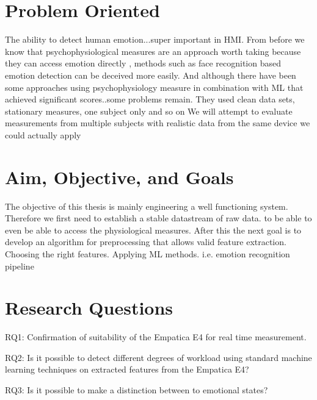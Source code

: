 
\section{Problem Oriented}
The ability to detect human emotion...super important in HMI.
From before we know that psychophysiological measures are an approach worth taking because they can access emotion directly , methods such as face recognition based emotion detection can be deceived more easily.
And although there have been some approaches using psychophysiology measure in combination with ML that achieved significant scores..some problems remain.
They used clean data sets, stationary measures, one subject only and so on
We will attempt to evaluate measurements from multiple subjects with realistic data from the same device we could actually apply
\section{Aim, Objective, and Goals}
The objective of this thesis is mainly engineering a well functioning system.
Therefore we first need to establish a stable datastream of raw data. to be able to even  be able to access the physiological measures.
After this the next goal is to develop an algorithm for preprocessing that allows valid feature extraction.
Choosing the right features.
Applying ML methods. i.e. emotion recognition pipeline

\section{Research Questions}
RQ1: Confirmation of suitability of the Empatica E4 for real time measurement.

RQ2: Is it possible to detect different degrees of workload using standard machine learning techniques on extracted features from the Empatica E4?

RQ3: Is it possible to make a distinction between to emotional states?

